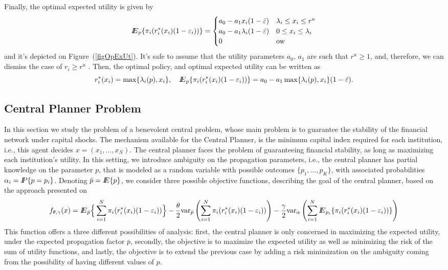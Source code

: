 Finally, the optimal expected utility is given by
\begin{equation}\label{eqEPOpt}
{I\kern-.35em E}_p\{\pi_i(r_i^*(x_i)(1-\varepsilon_i))\}=\begin{cases}
a_0-a_1x_i(1-\bar{\varepsilon})&\lambda_i\leq x_i\leq r^u\\
a_0-a_1\lambda_i(1-\bar{\varepsilon})&0\leq x_i\leq \lambda_i\\
0&{\rm ow}
\end{cases}
\end{equation}
and it's depicted on Figure~(\ref{figOpExUt}).  It's safe to assume that the utility parameters $a_0,\,a_1$ are such that $r^u\geq 1$, and, therefore, we can dismiss the case of $r_i\geq r^u$ .  Then, the optimal policy, and optimal expected utility can be written as
\[r_i^*(x_i)=\max\{\lambda_i(p),x_i\},\quad {I\kern-.35em E}_p\{\pi_i(r_i^*(x_i)(1-\varepsilon_i))\}=a_0-a_1\max\{\lambda_i(p),x_i\}(1-\bar{\varepsilon}).\]


\subsection{Central Planner  Problem}
In this section we study the problem of a benevolent  central problem, whose main problem is to guarantee the stability of the financial network under capital shocks. The mechanism available for the Central Planner, is the minimum capital index required for each institution, i.e., this agent decides $x=(x_1,\ldots,x_N)$.  The central planner faces the problem of guaranteeing financial stability, as long as maximizing each institution's utility.  In this setting, we introduce ambiguity on the propagation parameters, i.e., the central planner has partial knowledge on the parameter $p$, that is modeled as a random variable with possible outcomes $\{p_1,\ldots,p_K\}$, with associated probabilities $\alpha_i={I\kern-.35em P}\{p=p_i\}$.  Denoting $\bar{p}={I\kern-.35em E}\{p\}$, we consider three possible objective functions, describing the goal of the central planner, based on the approach presented on \cite{Mac13alpha}
\begin{equation}\label{objcp}
f_{\theta,\gamma}(x)= {I\kern-.35em E}_{\bar p}\Big\lbrace\sum_{i=1}^N \pi_i(r_i^*(x_i)(1-\varepsilon_i))\Big\rbrace-\frac{\theta}{2}{\mathop{\rm var}\nolimits}_{\bar p}\left(\sum_{i=1}^N\pi_i(r_i^*(x_i)(1-\varepsilon_i))\right)-\frac{\gamma}{2}{\mathop{\rm var}\nolimits}_\alpha\left(\sum_{i=1}^N{I\kern-.35em E}_{p_i}\{\pi_i(r_i^*(x_i)(1-\varepsilon_i))\}\right)
\end{equation}
This function offers a three different possibilities of analysis: first, the central planner is only concerned in maximizing the expected utility, under the expected propagation factor $\bar{p}$, secondly, the objective is to maximize the expected utility as well as minimizing the risk of the sum of utility functions, and lastly, the objective is to extend the previous case by adding a risk minimization on the ambiguity coming from the possibility of having different values of $p$.


